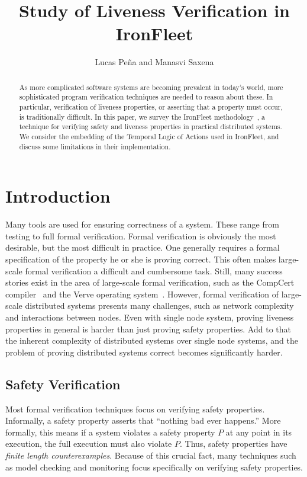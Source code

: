 \documentclass{llncs}
\begin{document}
%
\mainmatter              %
%
\title{Study of Liveness Verification in IronFleet}
%
\author{Lucas Pe\~{n}a and Manasvi Saxena}
%

\maketitle              %

\begin{abstract}
  As more complicated software systems are becoming prevalent in today's world,
  more sophisticated program verification techniques are needed to reason about
  these. In particular, verification of liveness properties, or asserting that a
  property must occur, is traditionally difficult. In this paper, we survey the
  IronFleet methodology~\cite{ironfleet}, a technique for verifying safety and
  liveness properties in practical distributed systems. 
  We consider the embedding of the Temporal Logic of Actions used in
  IronFleet, and discuss some limitations in their implementation.
\end{abstract}
%
\section{Introduction}
Many tools are used for ensuring correctness of a system. These range from
testing to full formal verification. Formal verification is obviously the most
desirable, but the most difficult in practice. One generally requires a formal
specification of the property he or she is proving correct. This often makes
large-scale formal verification a difficult and cumbersome task. Still, many
success stories exist in the area of large-scale formal verification, such as
the CompCert compiler~\cite{compcert} and the Verve operating
system~\cite{verve}.  However, formal verification of 
large-scale distributed systems presents many challenges, such as network
complexity and interactions between nodes. Even with single node system, proving 
liveness properties in general is harder than just proving safety properties.
Add to that the inherent complexity of distributed systems over single node systems,
and the problem of proving distributed systems correct becomes significantly harder.


\subsection{Safety Verification}
Most formal verification techniques focus on verifying safety
properties. Informally, a safety property asserts that ``nothing bad ever
happens.'' More formally, this means if a system violates a safety property $P$
at any point in its execution, the full execution must also violate $P$. Thus,
safety properties have \textit{finite length counterexamples}. Because of this
crucial fact, many techniques such as model checking and monitoring focus
specifically on verifying safety properties.
\end{document}
